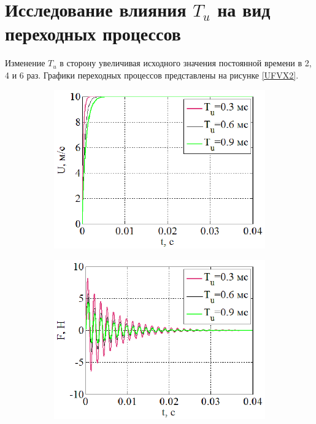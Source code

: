 \documentclass[a4paper,12pt]{article} %
\begin{document}
\section{Исследование влияния $T_u$ на вид переходных процессов}
Изменение $T_u$ в сторону увеличивая исходного значения постоянной времени в 2, 4 и 6 раз. Графики переходных процессов представлены на рисунке \ref{UFVX2}.
\begin{figure}[H]
	\centering
	\begin{subfigure}[b]{0.48\textwidth}
	    \includegraphics[width = \textwidth]{scheme/U2}
	\end{subfigure}
	\hfill
	\begin{subfigure}[b]{0.48\textwidth}
		\includegraphics[width = \textwidth]{scheme/F2}

\end{subfigure}
\end{figure}
\end{document}
